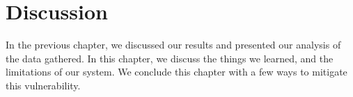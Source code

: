\chapter{Discussion}
    In the previous chapter, we discussed our results and presented our analysis of the data gathered. In this chapter, we discuss the things we learned, and the limitations of our system. We conclude this chapter with a few ways to mitigate this vulnerability.


